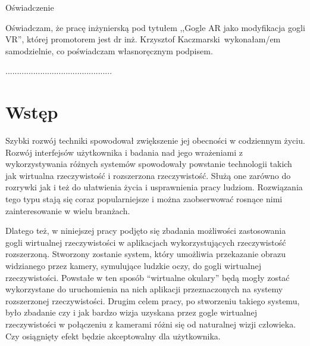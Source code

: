 \documentclass[a4paper,11pt,twoside]{report}
\theoremstyle{definition}
\newcommand{\tytul}{Gogle AR jako modyfikacja gogli VR}
\renewcommand{\title}{AR googles as modified VR googles}
\newcommand{\type}{inżyniers} %
\newcommand{\supervisor}{dr inż. Krzysztof Kaczmarski}
\begin{document}
\begin{center}
Oświadczenie %
\end{center}

\indent Oświadczam, że pracę \type ką pod
tytułem ,,\tytul '', której promotorem jest \supervisor \ wykonałam/em
samodzielnie, co poświadczam własnoręcznym podpisem.
\vspace{2cm}



\begin{flushright}
  \begin{minipage}{50mm}
    \begin{center}
      ..............................................

    \end{center}
  \end{minipage}
\end{flushright}

\thispagestyle{empty}
\newpage

\null\thispagestyle{empty}\newpage

\tableofcontents
\thispagestyle{empty}
\newpage
\null\thispagestyle{empty}\newpage
\setcounter{page}{11}
\pagestyle{fancy}


\chapter*{Wstęp} %

Szybki rozwój techniki spowodował zwiększenie jej obecności w codziennym życiu. Rozwój interfejsów użytkownika i badania nad jego wrażeniami z wykorzystywania różnych systemów spowodowały powstanie technologii takich jak wirtualna rzeczywistość i rozszerzona rzeczywistość. Służą one zarówno do rozrywki jak i też do ułatwienia życia i usprawnienia pracy ludziom. Rozwiązania tego typu stają się coraz popularniejsze i można zaobserwować rosnące nimi zainteresowanie w wielu branżach.

Dlatego też, w niniejszej pracy podjęto się zbadania możliwości zastosowania gogli wirtualnej rzeczywistości w aplikacjach wykorzystujących rzeczywistość rozszerzoną. Stworzony zostanie system, który umożliwia przekazanie obrazu widzianego przez kamery, symulujące ludzkie oczy, do gogli wirtualnej rzeczywistości. Powstałe w ten sposób ``wirtualne okulary'' będą mogły zostać wykorzystane do uruchomienia na nich aplikacji przeznaczonych na systemy rozszerzonej rzeczywistości.
Drugim celem pracy, po stworzeniu takiego systemu, było zbadanie czy i jak bardzo wizja uzyskana przez gogle wirtualnej rzeczywistości w połączeniu z kamerami różni się od naturalnej wizji człowieka. Czy osiągnięty efekt będzie akceptowalny dla użytkownika.
\end{document}
